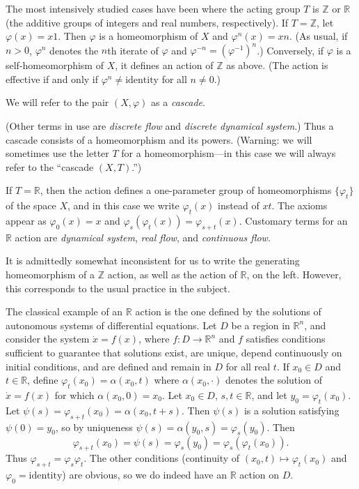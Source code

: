 The most intensively studied cases have been where the acting group $T$ is $\mathbb{Z}$ or $\mathbb{R}$ (the additive groups of integers and real numbers, respectively). If $T = \mathbb{Z}$, let $\varphi(x) = x1$. Then $\varphi$ is a homeomorphism of $X$ and $\varphi^{n}(x) = xn$. (As usual, if $n > 0$, $\varphi^{n}$ denotes the $n$th iterate of $\varphi$ and $\varphi^{-n} = (\varphi^{-1})^{n}$.) Conversely, if $\varphi$ is a self-homeomorphism of $X$, it defines an action of $\mathbb{Z}$ as above. (The action is effective if and only if $\varphi^{n} \neq \text{identity}$ for all $n \neq 0$.)

We will refer to the pair $(X, \varphi)$ as a \emph{cascade}.


(Other terms in use are \emph{discrete flow} and \emph{discrete dynamical system}.) Thus a cascade consists of a homeomorphism and its powers. (Warning: we will sometimes use the letter $T$ for a homeomorphism—in this case we will always refer to the ``cascade $(X, T)$.'')

If $T = \mathbb{R}$, then the action defines a one-parameter group of homeomorphisms $\{\varphi_{t}\}$ of the space $X$, and in this case we write $\varphi_{t}(x)$ instead of $xt$. The axioms appear as $\varphi_{0}(x) = x$ and $\varphi_{s}(\varphi_{t}(x)) = \varphi_{s+t}(x)$. Customary terms for an $\mathbb{R}$ action are \emph{dynamical system}, \emph{real flow}, and \emph{continuous flow}.

It is admittedly somewhat inconsistent for us to write the generating homeomorphism of a $\mathbb{Z}$ action, as well as the action of $\mathbb{R}$, on the left. However, this corresponds to the usual practice in the subject.

The classical example of an $\mathbb{R}$ action is the one defined by the solutions of autonomous systems of differential equations. Let $D$ be a region in $\mathbb{R}^{n}$, and consider the system $\dot{x} = f(x)$, where $f : D \to \mathbb{R}^{n}$ and $f$ satisfies conditions sufficient to guarantee that solutions exist, are unique, depend continuously on initial conditions, and are defined and remain in $D$ for all real $t$. If $x_{0} \in D$ and $t \in \mathbb{R}$, define $\varphi_{t}(x_{0}) = \alpha(x_{0},t)$ where $\alpha(x_{0},\cdot)$ denotes the solution of $\dot{x} = f(x)$ for which $\alpha(x_{0},0) = x_{0}$. Let $x_{0} \in D$, $s,t \in \mathbb{R}$, and let $y_{0} = \varphi_{t}(x_{0})$. Let $\psi(s) = \varphi_{s+t}(x_{0}) = \alpha(x_{0},t+s)$. Then $\psi(s)$ is a solution satisfying $\psi(0) = y_{0}$, so by uniqueness $\psi(s) = \alpha(y_{0},s) = \varphi_{s}(y_{0})$. Then
\[
    \varphi_{s+t}(x_{0}) = \psi(s) = \varphi_{s}(y_{0}) = \varphi_{s}(\varphi_{t}(x_{0})).
\]
Thus $\varphi_{s+t} = \varphi_{s}\varphi_{t}$. The other conditions (continuity of $(x_{0},t) \mapsto \varphi_{t}(x_{0})$ and $\varphi_{0} = \text{identity}$) are obvious, so we do indeed have an $\mathbb{R}$ action on $D$.

